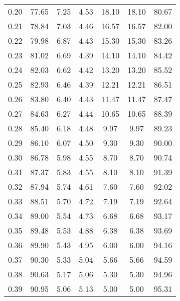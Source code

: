 \begin{tabular}{|c|c|c|c|c|c|c|}
      0.20 &     77.65 &      7.25 &       4.53 &   18.10 &      18.10 &         80.67 \\
      0.21 &     78.84 &      7.03 &       4.46 &   16.57 &      16.57 &         82.00 \\
      0.22 &     79.98 &      6.87 &       4.43 &   15.30 &      15.30 &         83.26 \\
      0.23 &     81.02 &      6.69 &       4.39 &   14.10 &      14.10 &         84.42 \\
      0.24 &     82.03 &      6.62 &       4.42 &   13.20 &      13.20 &         85.52 \\
      0.25 &     82.93 &      6.46 &       4.39 &   12.21 &      12.21 &         86.51 \\
      0.26 &     83.80 &      6.40 &       4.43 &   11.47 &      11.47 &         87.47 \\
      0.27 &     84.63 &      6.27 &       4.44 &   10.65 &      10.65 &         88.39 \\
      0.28 &     85.40 &      6.18 &       4.48 &    9.97 &       9.97 &         89.23 \\
      0.29 &     86.10 &      6.07 &       4.50 &    9.30 &       9.30 &         90.00 \\
      0.30 &     86.78 &      5.98 &       4.55 &    8.70 &       8.70 &         90.74 \\
      0.31 &     87.37 &      5.83 &       4.55 &    8.10 &       8.10 &         91.39 \\
      0.32 &     87.94 &      5.74 &       4.61 &    7.60 &       7.60 &         92.02 \\
      0.33 &     88.51 &      5.70 &       4.72 &    7.19 &       7.19 &         92.64 \\
      0.34 &     89.00 &      5.54 &       4.73 &    6.68 &       6.68 &         93.17 \\
      0.35 &     89.48 &      5.53 &       4.88 &    6.38 &       6.38 &         93.69 \\
      0.36 &     89.90 &      5.43 &       4.95 &    6.00 &       6.00 &         94.16 \\
      0.37 &     90.30 &      5.33 &       5.04 &    5.66 &       5.66 &         94.59 \\
      0.38 &     90.63 &      5.17 &       5.06 &    5.30 &       5.30 &         94.96 \\
      0.39 &     90.95 &      5.06 &       5.13 &    5.00 &       5.00 &         95.31 \\

\end{tabular}
